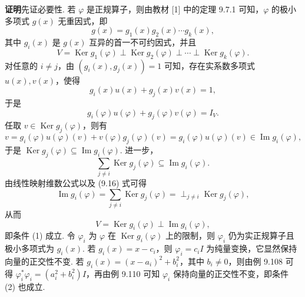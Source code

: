 \documentclass[UTF8,12pt,a4paper,fontset=fandol]{ctexart}
\begin{document}
\noindent\textbf{证明}\quad 先证必要性. 若 $\varphi$ 是正规算子，则由教材 [1] 中的定理 9.7.1 可知，$\varphi$ 的极小多项式 $g(x)$ 无重因式，即
\[
g(x)=g_1(x)g_2(x)\cdots g_k(x),
\]
其中 $g_i(x)$ 是 $g(x)$ 互异的首一不可约因式，并且
\begin{equation}
V=\operatorname{Ker} g_1(\varphi)\perp\operatorname{Ker} g_2(\varphi)\perp\cdots\perp\operatorname{Ker} g_k(\varphi).
\tag{9.16}
\end{equation}
对任意的 $i\ne j$，由 $(g_i(x),g_j(x))=1$ 可知，存在实系数多项式 $u(x),v(x)$，使得
\[
g_i(x)u(x)+g_j(x)v(x)=1,
\]
于是
\[
g_i(\varphi)u(\varphi)+g_j(\varphi)v(\varphi)=I_V.
\]
任取 $v\in\operatorname{Ker}g_j(\varphi)$，则有
\[
v=g_i(\varphi)u(\varphi)(v)+v(\varphi)g_j(\varphi)(v)=g_i(\varphi)u(\varphi)(v)\in\operatorname{Im}g_i(\varphi),
\]
于是 $\operatorname{Ker}g_j(\varphi)\subseteq\operatorname{Im}g_i(\varphi)$. 进一步，
\[
\sum_{j\ne i}\operatorname{Ker}g_j(\varphi)\subseteq\operatorname{Im}g_i(\varphi).
\]
由线性映射维数公式以及 (9.16) 式可得
\[
\operatorname{Im}g_i(\varphi)=\sum_{j\ne i}\operatorname{Ker}g_j(\varphi)=\perp_{j\ne i}\operatorname{Ker}g_j(\varphi),
\]
从而
\[
V=\operatorname{Ker}g_i(\varphi)\perp\operatorname{Im}g_i(\varphi),
\]
即条件 (1) 成立. 令 $\varphi_i$ 为 $\varphi$ 在 $\operatorname{Ker}g_i(\varphi)$ 上的限制，则 $\varphi_i$ 仍为实正规算子且极小多项式为 $g_i(x)$. 若 $g_i(x)=x-c_i$，则 $\varphi_i=c_iI$ 为纯量变换，它显然保持向量的正交性不变. 若 $g_i(x)=(x-a_i)^2+b_i^2$，其中 $b_i\ne0$，则由例 9.108 可得 $\varphi_i^*\varphi_i=(a_i^2+b_i^2)I$，再由例 9.110 可知 $\varphi_i$ 保持向量的正交性不变，即条件 (2) 也成立.
\end{document}
